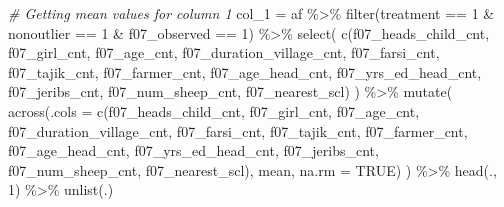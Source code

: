 \documentclass[
]{article}
\newenvironment{Shaded}{\begin{snugshade}}{\end{snugshade}}
\newcommand{\AttributeTok}[1]{\textcolor[rgb]{0.77,0.63,0.00}{#1}}
\newcommand{\CommentTok}[1]{\textcolor[rgb]{0.56,0.35,0.01}{\textit{#1}}}
\newcommand{\ConstantTok}[1]{\textcolor[rgb]{0.00,0.00,0.00}{#1}}
\newcommand{\DecValTok}[1]{\textcolor[rgb]{0.00,0.00,0.81}{#1}}
\newcommand{\FunctionTok}[1]{\textcolor[rgb]{0.00,0.00,0.00}{#1}}
\newcommand{\NormalTok}[1]{#1}
\newcommand{\OtherTok}[1]{\textcolor[rgb]{0.56,0.35,0.01}{#1}}
\newcommand{\SpecialCharTok}[1]{\textcolor[rgb]{0.00,0.00,0.00}{#1}}
\begin{document}
\begin{Shaded}
\begin{Highlighting}[]
\CommentTok{\# Getting mean values for column 1}
\NormalTok{col\_1 }\OtherTok{=}\NormalTok{ af }\SpecialCharTok{\%\textgreater{}\%} 
  \FunctionTok{filter}\NormalTok{(treatment }\SpecialCharTok{==} \DecValTok{1} \SpecialCharTok{\&}\NormalTok{ nonoutlier }\SpecialCharTok{==} \DecValTok{1} \SpecialCharTok{\&}\NormalTok{ f07\_observed }\SpecialCharTok{==} \DecValTok{1}\NormalTok{) }\SpecialCharTok{\%\textgreater{}\%} 
  \FunctionTok{select}\NormalTok{(}
    \FunctionTok{c}\NormalTok{(f07\_heads\_child\_cnt, f07\_girl\_cnt, f07\_age\_cnt, f07\_duration\_village\_cnt,}
\NormalTok{                   f07\_farsi\_cnt,  f07\_tajik\_cnt,  f07\_farmer\_cnt, }
\NormalTok{                   f07\_age\_head\_cnt, f07\_yrs\_ed\_head\_cnt, f07\_jeribs\_cnt, }
\NormalTok{                   f07\_num\_sheep\_cnt, f07\_nearest\_scl)}
\NormalTok{  ) }\SpecialCharTok{\%\textgreater{}\%} 
  \FunctionTok{mutate}\NormalTok{(}
  \FunctionTok{across}\NormalTok{(}\AttributeTok{.cols =} \FunctionTok{c}\NormalTok{(f07\_heads\_child\_cnt, f07\_girl\_cnt, f07\_age\_cnt, f07\_duration\_village\_cnt,}
\NormalTok{                   f07\_farsi\_cnt,  f07\_tajik\_cnt,  f07\_farmer\_cnt, }
\NormalTok{                   f07\_age\_head\_cnt, f07\_yrs\_ed\_head\_cnt, f07\_jeribs\_cnt, }
\NormalTok{                   f07\_num\_sheep\_cnt, f07\_nearest\_scl), mean, }\AttributeTok{na.rm =} \ConstantTok{TRUE}\NormalTok{)}
\NormalTok{  ) }\SpecialCharTok{\%\textgreater{}\%} \FunctionTok{head}\NormalTok{(., }\DecValTok{1}\NormalTok{) }\SpecialCharTok{\%\textgreater{}\%} \FunctionTok{unlist}\NormalTok{(.)}


\end{Highlighting}
\end{Shaded}
\end{document}

